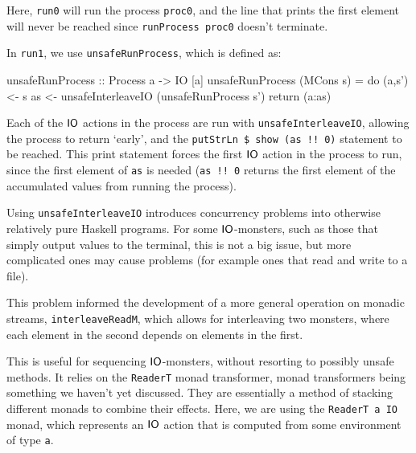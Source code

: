 Here, \verb+run0+ will run the process \verb+proc0+, and the line that prints the first element will never be reached since \verb+runProcess proc0+ doesn't terminate.

In \verb+run1+, we use \verb+unsafeRunProcess+, which is defined as:

\begin{haskell}
unsafeRunProcess :: Process a -> IO [a]
unsafeRunProcess (MCons s) = 
	do (a,s') <- s
	   as     <- unsafeInterleaveIO (unsafeRunProcess s')
	   return (a:as)
\end{haskell}

Each of the $\mathsf{IO}$ actions in the process are run with \verb+unsafeInterleaveIO+, allowing the process to return `early', and the \verb+putStrLn $ show (as !! 0)+ statement to be reached. This print statement forces the first $\mathsf{IO}$ action in the process to run, since the first element of \verb+as+ is needed (\verb+as !! 0+ returns the first element of the accumulated values from running the process).

Using \verb+unsafeInterleaveIO+ introduces concurrency problems into otherwise relatively pure Haskell programs. For some $\mathsf{IO}$-monsters, such as those that simply output values to the terminal, this is not a big issue, but more complicated ones may cause problems (for example ones that read and write to a file). \\


This problem informed the development of a more general operation on monadic streams, \verb+interleaveReadM+, which allows for interleaving two monsters, where each element in the second depends on elements in the first.


This is useful for sequencing $\mathsf{IO}$-monsters, without resorting to possibly unsafe methods. It relies on the \verb+ReaderT+ monad transformer, monad transformers being something we haven't yet discussed. They are essentially a method of stacking different monads to combine their effects. Here, we are using the \verb+ReaderT a IO+ monad, which represents an $\mathsf{IO}$ action that is computed from some environment of type \verb+a+.


